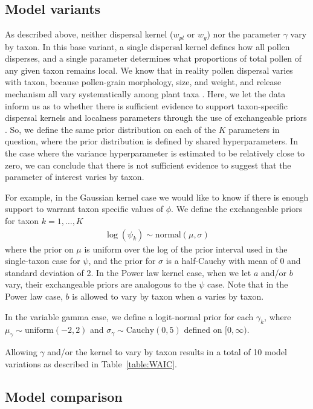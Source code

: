 \documentclass[12pt]{article}
\begin{document}
\subsection{Model variants}

As described above, neither dispersal kernel ($w_{pl}$ or $w_g$) nor
the parameter $\gamma$ vary by taxon. In this base variant, a single
dispersal kernel defines how all pollen disperses, and a single
parameter determines what proportions of total pollen of any given
taxon remains local. We know that in reality pollen dispersal varies
with taxon, because pollen-grain morphology, size, and weight, and
release mechanism all vary systematically among plant taxa
\citep{jackson1999pollen}. Here, we let the data inform us as to
whether there is sufficient evidence to support taxon-specific
dispersal kernels and localness parameters through the use of
exchangeable priors \citep{XXX}. So, we define the same prior
distribution on each of the $K$ parameters in question, where the
prior distribution is defined by shared hyperparameters. In the case
where the variance hyperparameter is estimated to be relatively close
to zero, we can conclude that there is not sufficient evidence to
suggest that the parameter of interest varies by taxon.

For example, in the Gaussian kernel case we would like to know
if there is enough support to warrant taxon specific values of
$\phi$. We define the exchangeable priors for taxon $k=1, \ldots, K$
\begin{align}
\log(\psi_k) \sim \text{normal}( \mu, \sigma)
\end{align}
where the prior on $\mu$ is uniform over the log of the prior interval
used in the single-taxon case for $\psi$, and the prior for $\sigma$
is a half-Cauchy with mean of 0 and standard deviation of 2. In the
Power law kernel case, when we let $a$ and/or $b$ vary, their
exchangeable priors are analogous to the $\psi$ case. Note that in the
Power law case, $b$ is allowed to vary by taxon when $a$ varies by taxon.

In the variable gamma case, we define a logit-normal prior for each
$\gamma_k$, where $\mu_{\gamma} \sim \text{uniform}(-2, 2)$ and $\sigma_{\gamma}
\sim \text{Cauchy}(0,5)$ defined on $[0,\infty)$.

Allowing $\gamma$ and/or the kernel to vary by taxon results in a
total of 10 model variations as described in Table~\ref{table:WAIC}.

\subsection{Model comparison}
\end{document}
